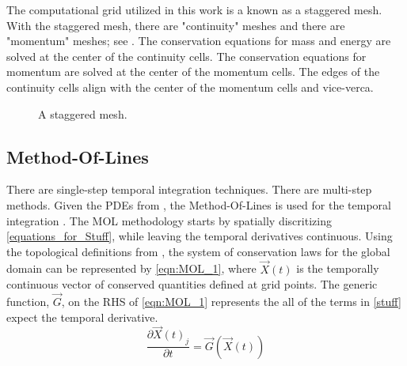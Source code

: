The computational grid utilized in this work is a known as a staggered mesh.
With the staggered mesh, there are "continuity" meshes and there are "momentum" meshes; see .
The conservation equations for mass and energy are solved at the center of the continuity cells.
The conservation equations for momentum are solved at the center of the momentum cells.
The edges of the continuity cells align with the center of the momentum cells and vice-verca.

\begin{figure}[ht]
\caption{A staggered mesh.}
\label{fig:staggered_mesh}
\begin{center}
\end{center}
\end{figure}

\subsection{Method-Of-Lines}
\label{subsect:numerics_explicit}
There are single-step temporal integration techniques.
There are multi-step methods.
Given the PDEs from , the Method-Of-Lines is used for the temporal integration \cite{LeVeque2007}.
The MOL methodology starts by spatially discritizing \eqref{equations_for_Stuff}, while leaving the temporal derivatives continuous.
Using the topological definitions from , the system of conservation laws for the global domain can be represented by \eqref{eqn:MOL_1}, where $\vec{X}(t)$ is the temporally continuous vector of conserved quantities defined at grid points.
The generic function, $\vec{G}$, on the RHS of \eqref{eqn:MOL_1} represents the all of the terms in \eqref{stuff} expect the temporal derivative.
\begin{equation}
\label{eqn:MOL_1}
\frac{\partial \vec{X}(t)_j}{\partial t} = \vec{G}(\vec{X}(t))
\end{equation}

